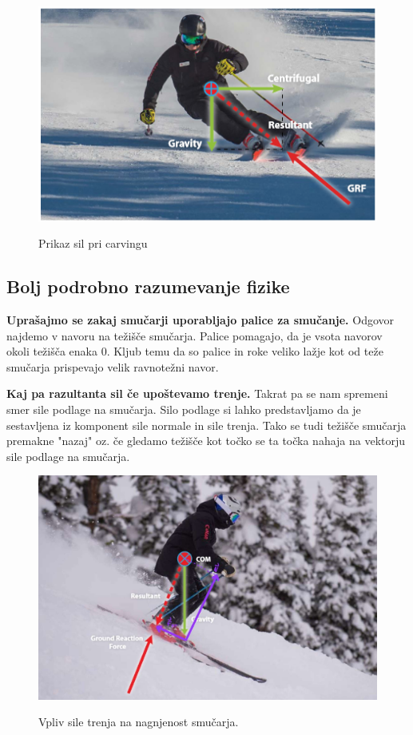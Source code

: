 \documentclass{article}
\begin{document}
\begin{figure}
    \centering
    \includegraphics[scale=0.8]{../images/Screenshot 2023-12-03 152028.png} \\
    \caption[short]{Prikaz sil pri carvingu}
\end{figure}


\subsection{Bolj podrobno razumevanje fizike}
\textbf{Uprašajmo se zakaj smučarji uporabljajo palice za smučanje.} Odgovor najdemo v navoru na težišče smučarja.
Palice pomagajo, da je vsota navorov okoli težišča enaka 0. Kljub temu da so palice in roke veliko lažje kot
od teže smučarja prispevajo velik ravnotežni navor. \\ \newline

\textbf{Kaj pa razultanta sil če upoštevamo trenje.} Takrat pa se nam spremeni smer sile podlage na smučarja.
Silo podlage si lahko predstavljamo da je sestavljena iz komponent sile normale in sile trenja. 
Tako se tudi težišče smučarja premakne "nazaj" oz. če gledamo težišče kot točko se ta točka nahaja na vektorju
sile podlage na smučarja. \\ \newline

\begin{figure}
    \centering
    \includegraphics[scale=0.18]{../images/Sile pri com.jpg} \\
    \caption[short]{Vpliv sile trenja na nagnjenost smučarja.}
\end{figure}
\end{document}
